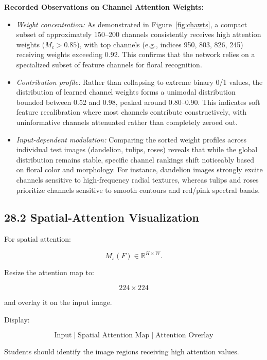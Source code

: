 \documentclass[10pt]{article}
\begin{document}
\textbf{Recorded Observations on Channel Attention Weights:}
\begin{itemize}
\item \textit{Weight concentration:} As demonstrated in Figure~\ref{fig:chawts}, a compact subset of approximately 150--200 channels consistently receives high attention weights ($M_c > 0.85$), with top channels (e.g., indices 950, 803, 826, 245) receiving weights exceeding 0.92. This confirms that the network relies on a specialized subset of feature channels for floral recognition.
\item \textit{Contribution profile:} Rather than collapsing to extreme binary 0/1 values, the distribution of learned channel weights forms a unimodal distribution bounded between 0.52 and 0.98, peaked around 0.80--0.90. This indicates soft feature recalibration where most channels contribute constructively, with uninformative channels attenuated rather than completely zeroed out.
\item \textit{Input-dependent modulation:} Comparing the sorted weight profiles across individual test images (dandelion, tulips, roses) reveals that while the global distribution remains stable, specific channel rankings shift noticeably based on floral color and morphology. For instance, dandelion images strongly excite channels sensitive to high-frequency radial textures, whereas tulips and roses prioritize channels sensitive to smooth contours and red/pink spectral bands.
\end{itemize}

\subsection*{28.2 Spatial-Attention Visualization}

For spatial attention:

\[
M_s(F)
\in
\mathbb{R}^{H\times W}.
\]

Resize the attention map to:

\[
224\times224
\]

and overlay it on the input image.

Display:

\[
\boxed{
\text{Input}
\;|\;
\text{Spatial Attention Map}
\;|\;
\text{Attention Overlay}
}
\]

Students should identify the image regions receiving high attention values.
\end{document}

